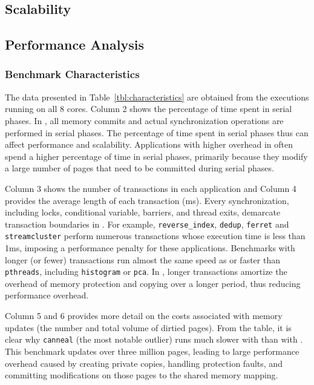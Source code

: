 \subsection{Scalability}



\subsection{Performance Analysis}

\subsubsection{Benchmark Characteristics}

The data presented in Table~\ref{tbl:characteristics} are obtained from the executions running on all 8 cores.  Column 2 shows the percentage of time spent in serial phases.  In \dthreads{}, all memory commits and actual synchronization operations are performed in serial phases.  The percentage of time spent in serial phases thus can affect performance and scalability. Applications with higher overhead in \dthreads{} often spend a higher percentage of time in
serial phases, primarily because they modify a large number of pages that need to be committed during serial phases.

Column 3 shows the number of transactions in each application and Column 4 provides the average length of each transaction (ms).  Every synchronization, including locks, conditional variable, barriers, and thread exits, demarcate transaction boundaries in \dthreads{}.  For example, \texttt{reverse\_index}, \texttt{dedup}, \texttt{ferret}
and \texttt{streamcluster} perform numerous transactions whose
execution time is less than 1ms, imposing a performance penalty for these applications.  Benchmarks with longer (or fewer) transactions run almost the same speed as or faster than \texttt{pthreads}, including \texttt{histogram} or \texttt{pca}.  In \dthreads{}, longer transactions amortize the overhead of memory protection and copying over a longer period, thus reducing performance overhead.

Column 5 and 6 provides more detail on the costs associated with memory updates (the number and total volume of dirtied pages). From the table, it is clear why \texttt{canneal} (the most notable outlier) runs much slower with \dthreads{} than with \pthreads{}. This benchmark updates over three million pages, leading to large performance overhead caused by creating private copies, handling protection faults, and committing modifications on those pages to the shared memory mapping. 

